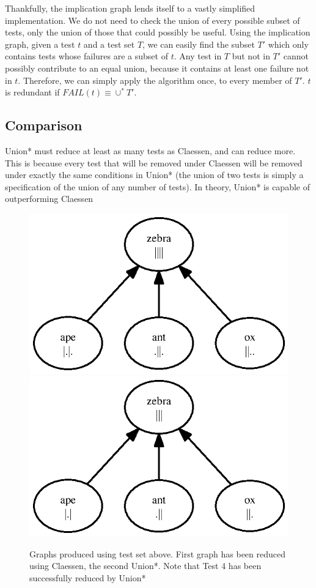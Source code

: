 \documentclass[11pt]{article}
\begin{document}
Thankfully, the implication graph lends itself to a vastly simplified implementation. We do not need to check the union of every possible subset of tests, only the union of those that could possibly be useful. Using the implication graph, given a test $t$ and a test set $T$, we can easily find the subset $T\prime$ which only contains tests whose failures are a subset of $t$. Any test in $T$ but not in $T\prime$ cannot possibly contribute to an equal union, because it contains at least one failure not in $t$. Therefore, we can simply apply the algorithm once, to every member of $T\prime$. $t$ is redundant if $FAIL(t) \equiv \cup^* T\prime$.

\subsection{Comparison}
Union* must reduce at least as many tests as Claessen, and can reduce more. This is because every test that will be removed under Claessen will be removed under exactly the same conditions in Union* (the union of two tests is simply a specification of the union of any number of tests). In theory, Union* is capable of outperforming Claessen

\begin{figure}

\includegraphics{toy.ps}
\includegraphics{toyb.ps}
\caption{Graphs produced using test set above. First graph has been reduced using Claessen, the second Union*. Note that Test 4 has been successfully reduced by Union*}
\end{figure}
\end{document}
